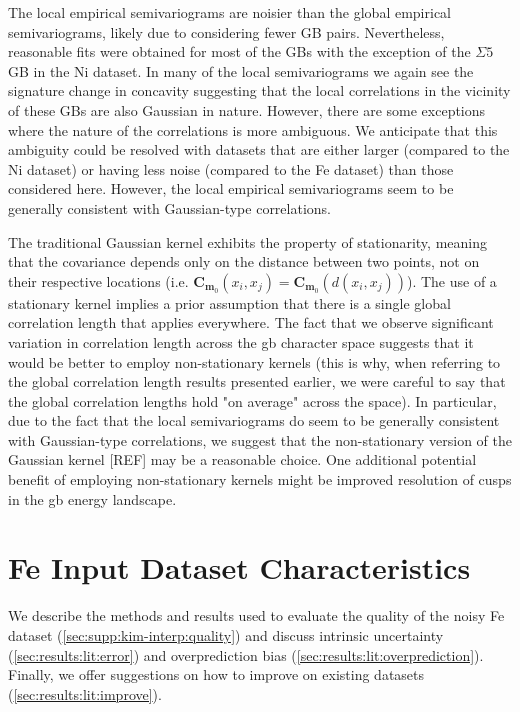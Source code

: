 \documentclass[preprint,12pt]{elsarticle}
\begin{document}
    The local empirical semivariograms are noisier than the global empirical semivariograms, likely due to considering fewer GB pairs. Nevertheless, reasonable fits were obtained for most of the GBs with the exception of the $\Sigma 5$ GB in the Ni dataset. In many of the local semivariograms we again see the signature change in concavity suggesting that the local correlations in the vicinity of these GBs are also Gaussian in nature. However, there are some exceptions where the nature of the correlations is more ambiguous. We anticipate that this ambiguity could be resolved with datasets that are either larger (compared to the Ni dataset) or having less noise (compared to the Fe dataset) than those considered here. However, the local empirical semivariograms seem to be generally consistent with Gaussian-type correlations.
    
    The traditional Gaussian kernel exhibits the property of stationarity, meaning that the covariance depends only on the distance between two points, not on their respective locations (i.e. $\mathbf{C}_{\mathbf{m}_0}\!\left(x_i,x_j\right) = \mathbf{C}_{\mathbf{m}_0}\!\left(d\left(x_i,x_j\right)\right)$). The use of a stationary kernel implies a prior assumption that there is a single global correlation length that applies everywhere. The fact that we observe significant variation in correlation length across the \gls{gb} character space suggests that it would be better to employ non-stationary kernels (this is why, when referring to the global correlation length results presented earlier, we were careful to say that the global correlation lengths hold "on average" across the space). In particular, due to the fact that the local semivariograms do seem to be generally consistent with Gaussian-type correlations, we suggest that the non-stationary version of the Gaussian kernel [REF] may be a reasonable choice. One additional potential benefit of employing non-stationary kernels might be improved resolution of cusps in the \gls{gb} energy landscape.


\section{Fe Input Dataset Characteristics}
    We describe the methods and results used to evaluate the quality of the noisy Fe dataset (\cref{sec:supp:kim-interp:quality}) and discuss intrinsic uncertainty (\cref{sec:results:lit:error}) and overprediction bias (\cref{sec:results:lit:overprediction}). Finally, we offer suggestions on how to improve on existing datasets (\cref{sec:results:lit:improve}).
    
\end{document}
